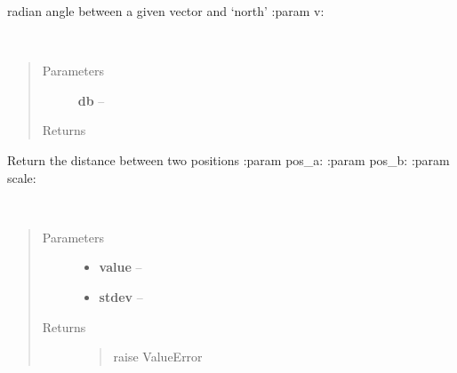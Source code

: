 \documentclass[letterpaper,10pt,english]{sphinxmanual}
\begin{document}

\begin{fulllineitems}
\label{index:aietes.Tools.bearing}
radian angle between a given vector and `north'
:param v:

\end{fulllineitems}


\begin{fulllineitems}
\label{index:aietes.Tools.db2linear}~\begin{quote}\begin{description}
\item[{Parameters}] \leavevmode
\textbf{db} -- 

\item[{Returns}] \leavevmode


\end{description}\end{quote}

\end{fulllineitems}


\begin{fulllineitems}
\label{index:aietes.Tools.distance}
Return the distance between two positions
:param pos\_a:
:param pos\_b:
:param scale:

\end{fulllineitems}


\begin{fulllineitems}
\label{index:aietes.Tools.fudge_normal}~\begin{quote}\begin{description}
\item[{Parameters}] \leavevmode\begin{itemize}
\item {} 
\textbf{value} -- 

\item {} 
\textbf{stdev} -- 

\end{itemize}

\item[{Returns}] \leavevmode
\begin{quote}\begin{description}
\item[{raise ValueError}] \leavevmode
\end{description}\end{quote}


\end{description}\end{quote}

\end{fulllineitems}
\end{document}
